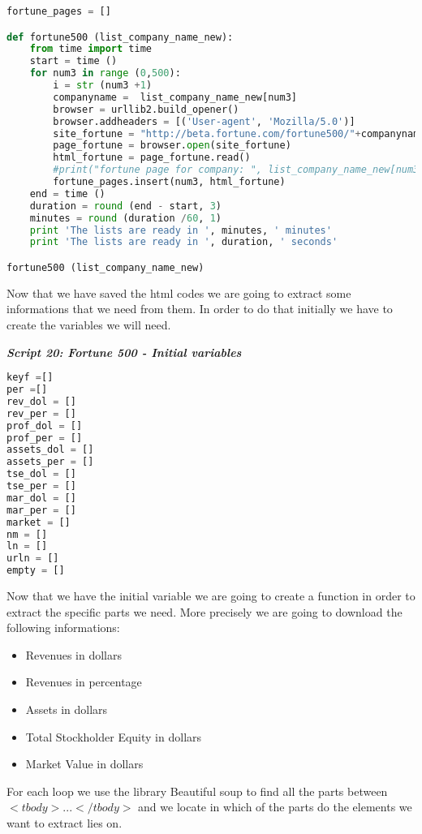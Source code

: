 \documentclass{article}
\begin{document}
\begin{lstlisting}[language=Python] 
fortune_pages = []

def fortune500 (list_company_name_new):
    from time import time  
    start = time ()
    for num3 in range (0,500):
        i = str (num3 +1)    
        companyname =  list_company_name_new[num3]
        browser = urllib2.build_opener() 
        browser.addheaders = [('User-agent', 'Mozilla/5.0')]
        site_fortune = "http://beta.fortune.com/fortune500/"+companyname+"-"+ i    
        page_fortune = browser.open(site_fortune)
        html_fortune = page_fortune.read()    
        #print("fortune page for company: ", list_company_name_new[num3],i)
        fortune_pages.insert(num3, html_fortune)
    end = time ()
    duration = round (end - start, 3)
    minutes = round (duration /60, 1)
    print 'The lists are ready in ', minutes, ' minutes'
    print 'The lists are ready in ', duration, ' seconds'

fortune500 (list_company_name_new)
\end{lstlisting}    
Now that we have saved the html codes we are going to extract some informations that we need from them. In order to do that initially we have to create the variables we will need.
\begin{center}
\textit{\textbf{Script 20: Fortune 500 - Initial variables}}
\end{center}
\begin{lstlisting}[language=Python] 
keyf =[]
per =[]
rev_dol = []
rev_per = []
prof_dol = []
prof_per = []
assets_dol = []
assets_per = []
tse_dol = []
tse_per = []
mar_dol = []
mar_per = []
market = []
nm = []
ln = []
urln = []
empty = []
\end{lstlisting}    
Now that we have the initial variable we are going to create a function in order to extract the specific parts we need. More precisely we are going to download the following informations:
\begin{itemize}
\item Revenues in dollars
\item Revenues in percentage
\item Assets in dollars
\item Total Stockholder Equity in dollars
\item Market Value in dollars
\end{itemize}
For each loop we use the library Beautiful soup to find all the parts between $<tbody>...</tbody>$ and we locate in which of the parts do the elements we want to extract lies on.\\
\end{document}

